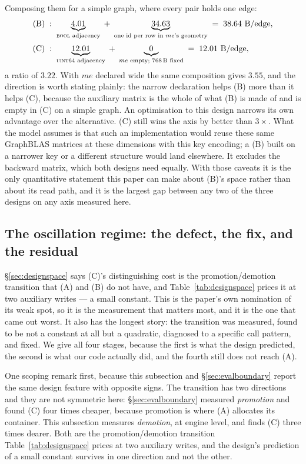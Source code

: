 \documentclass[11pt,a4paper]{article}
\theoremstyle{plain}
\theoremstyle{definition}
\theoremstyle{remark}
\begin{document}
Composing them for a simple graph, where every pair holds one edge:
\[
  \begin{aligned}
    \text{(B)} \;&:\;
      \underbrace{4.01}_{\text{\textsc{bool} adjacency}}
      \;+\; \underbrace{34.63}_{\text{one id per row in } me\text{'s geometry}}
      \;=\; 38.64 \ \text{B/edge},
    \\[2pt]
    \text{(C)} \;&:\;
      \underbrace{12.01}_{\text{\textsc{uint64} adjacency}}
      \;+\; \underbrace{0}_{me \text{ empty; } 768\,\text{B fixed}}
      \;=\; 12.01 \ \text{B/edge},
  \end{aligned}
\]
a ratio of $3.22$. With $me$ declared wide the same composition gives $3.55$,
and the direction is worth stating plainly: the narrow declaration helps (B)
more than it helps (C), because the auxiliary matrix is the whole of what (B)
is made of and is empty in (C) on a simple graph. An optimisation to this
design narrows its own advantage over the alternative. (C) still wins the axis
by better than $3\times$. What the model assumes is that such an implementation
would reuse these same GraphBLAS matrices at these dimensions with this key
encoding; a (B) built on a narrower key or a different structure would land
elsewhere. It excludes the backward matrix, which both designs need equally.
With those caveats it is the only quantitative statement this paper can make
about (B)'s space rather than about its read path, and it is the largest gap
between any two of the three designs on any axis measured here.

\subsection{The oscillation regime: the defect, the fix, and the residual}
\label{sec:evalosc}

\S\ref{sec:designspace} says (C)'s distinguishing cost is the
promotion/demotion transition that (A) and (B) do not have, and
Table~\ref{tab:designspace} prices it at two auxiliary writes --- a small
constant. This is the paper's own nomination of its weak spot, so it is the
measurement that matters most, and it is the one that came out worst. It also
has the longest story: the transition was measured, found to be not a constant
at all but a quadratic, diagnosed to a specific call pattern, and fixed. We give
all four stages, because the first is what the design predicted, the second is
what our code actually did, and the fourth still does not reach (A).

One scoping remark first, because this subsection and \S\ref{sec:evalboundary}
report the same design feature with opposite signs. The transition has two
directions and they are not symmetric here: \S\ref{sec:evalboundary} measured
\emph{promotion} and found (C) four times cheaper, because promotion is where
(A) allocates its container. This subsection measures \emph{demotion}, at engine
level, and finds (C) three times dearer. Both are the promotion/demotion
transition Table~\ref{tab:designspace} prices at two auxiliary writes, and the
design's prediction of a small constant survives in one direction and not the
other.
\end{document}

